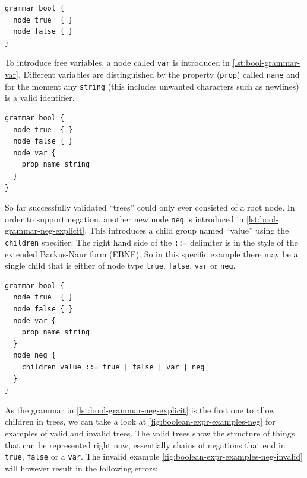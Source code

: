 \documentclass[]{report}
\begin{document}
\begin{listing}[H]
\begin{verbatim}
grammar bool {
  node true  { }
  node false { }
}
\end{verbatim}
\caption{Boolean Expression Grammar: constants $true$ and $false$}
\label{lst:bool-grammar-true-false}
\end{listing}

To introduce free variables, a node called \texttt{var} is introduced in \cref{lst:bool-grammar-var}. Different variables are distinguished by the property (\texttt{prop}) called \texttt{name} and for the moment any \texttt{string} (this includes unwanted characters such as newlines) is a valid identifier.

\begin{listing}[H]
\begin{verbatim}
grammar bool {
  node true  { }
  node false { }
  node var {
    prop name string
  }
}
\end{verbatim}
\caption{Boolean Expression Grammar: User defined variables }
\label{lst:bool-grammar-var}
\end{listing}

So far successfully validated \enquote{trees} could only ever consisted of a root node. In order to support negation, another new node \texttt{neg} is introduced in \cref{lst:bool-grammar-neg-explicit}. This introduces a child group named \enquote{value} using the \texttt{children} specifier. The right hand side of the \texttt{::=} delimiter is in the style of the extended Backus-Naur form (EBNF). So in this specific example there may be a single child that is either of node type \texttt{true}, \texttt{false}, \texttt{var} or \texttt{neg}.

\begin{listing}[H]
\begin{verbatim}
grammar bool {
  node true  { }
  node false { }
  node var {
    prop name string
  }
  node neg {
    children value ::= true | false | var | neg
  }
}
\end{verbatim}
\caption{Boolean Expression Grammar: Negation }
\label{lst:bool-grammar-neg-explicit}
\end{listing}

As the grammar in \cref{lst:bool-grammar-neg-explicit} is the first one to allow children in trees, we can take a look at \cref{fig:boolean-expr-examples-neg} for examples of valid and invalid trees. The valid trees show the structure of things that can be represented right now, essentially chains of negations that end in \texttt{true}, \texttt{false} or a \texttt{var}. The invalid example \cref{fig:boolean-expr-examples-neg-invalid} will however result in the following errors:
\end{document}
